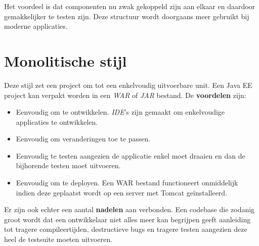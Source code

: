 \documentclass{report}
\begin{document}
	Het voordeel is dat componenten nu zwak gekoppeld zijn aan elkaar en daardoor gemakkelijker te testen zijn. Deze structuur wordt doorgaans meer gebruikt bij moderne applicaties.
	
	\section{Monolitische stijl}
	Deze stijl zet een project om tot een enkelvoudig uitvoerbare unit. Een Java EE project kan verpakt worden in een \textit{WAR} of \textit{JAR} bestand. De \textbf{voordelen} zijn:
	\begin{itemize}
		\item Eenvoudig om te ontwikkelen. \textit{IDE}'s zijn gemaakt om enkelvoudige applicaties te ontwikkelen.
		\item Eenvoudig om veranderingen toe te passen. 
		\item Eenvoudig te testen aangezien de applicatie enkel moet draaien en dan de bijhorende testen moet uitvoeren.
		\item Eenvoudig om te deployen. Een WAR bestand functioneert onmiddelijk indien deze geplaatst wordt op een server met Tomcat geïnstalleerd.
	\end{itemize}
	Er zijn ook echter een aantal \textbf{nadelen} aan verbonden. Een codebase die zodanig groot wordt dat een ontwikkelaar niet alles meer kan begrijpen geeft aanleiding tot tragere compileertijden, destructieve bugs en tragere testen aangezien deze heel de testsuite moeten uitvoeren.
	
\end{document}
